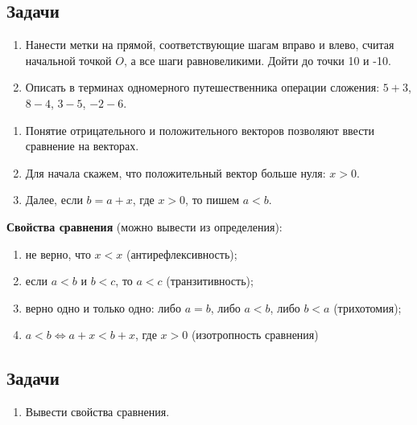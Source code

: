 \subsection*{Задачи}
\begin{enumerate}
\item Нанести метки на прямой, соответствующие шагам вправо и влево, считая начальной точкой $O$, а все шаги равновеликими. Дойти до точки 10 и -10.
\item Описать в терминах одномерного путешественника операции сложения: $5+3$, $8-4$, $3-5$, $-2-6$.
\end{enumerate}



\begin{enumerate}
\item Понятие отрицательного и положительного векторов позволяют ввести сравнение на векторах.
\item Для начала скажем, что положительный вектор больше нуля: $x>0$.
\item Далее, если $b=a+x$, где $x>0$, то пишем $a<b$.
\end{enumerate}

\textbf{Свойства сравнения} (можно вывести из определения):
\begin{enumerate}[label=O\arabic*]
\item не верно, что $x<x$ (антирефлексивность);
\item если $a<b$ и $b<c$, то $a<c$ (транзитивность);
\item верно одно и только одно: либо $a=b$, либо $a<b$, либо $b<a$ (трихотомия);
\item $a<b\Leftrightarrow a+x<b+x$, где $x>0$ (изотропность сравнения)
\end{enumerate}

\subsection*{Задачи}
\begin{enumerate}
\item Вывести свойства сравнения.
\end{enumerate}






